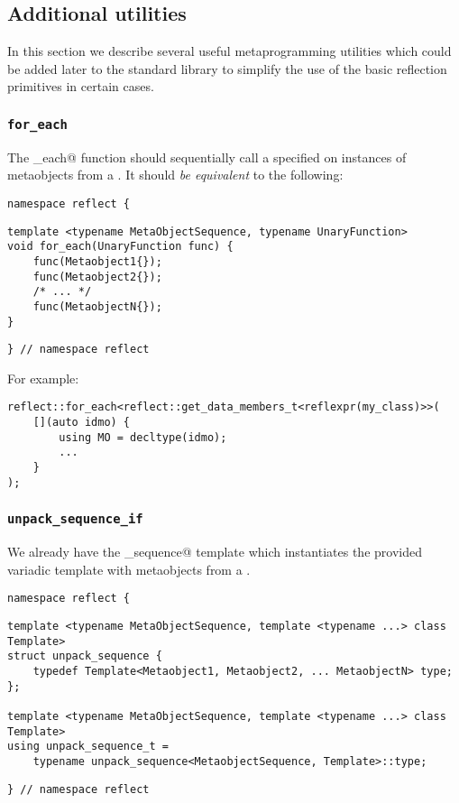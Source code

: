 \subsection{Additional utilities}
\label{fut-facade}

In this section we describe several useful metaprogramming utilities which
could be added later to the standard library to simplify the use of the basic
reflection primitives in certain cases.
 
\subsubsection{\texttt{for\_each}}
\label{fac-for-each}

The \verb@for_each@ function should sequentially call a specified
\verb@UnaryFunction@ on instances of metaobjects from
a . It should {\em be equivalent} to the following:

\begin{verbatim}
namespace reflect {
\end{verbatim}
\begin{verbatim}
template <typename MetaObjectSequence, typename UnaryFunction>
void for_each(UnaryFunction func) {
	func(Metaobject1{});
	func(Metaobject2{});
	/* ... */
	func(MetaobjectN{});
}
\end{verbatim}
\begin{verbatim}
} // namespace reflect
\end{verbatim}

For example:

\begin{verbatim}
reflect::for_each<reflect::get_data_members_t<reflexpr(my_class)>>(
	[](auto idmo) {
		using MO = decltype(idmo);
		...
	}
);
\end{verbatim}

\subsubsection{\texttt{unpack\_sequence\_if}}
\label{fac-unpack-sequence}

We already have the \verb@unpack_sequence@ template which instantiates
the provided variadic template with metaobjects from a .

\begin{verbatim}
namespace reflect {
\end{verbatim}
\begin{verbatim}
template <typename MetaObjectSequence, template <typename ...> class Template>
struct unpack_sequence {
	typedef Template<Metaobject1, Metaobject2, ... MetaobjectN> type;
};

template <typename MetaObjectSequence, template <typename ...> class Template>
using unpack_sequence_t =
	typename unpack_sequence<MetaobjectSequence, Template>::type;
\end{verbatim}
\begin{verbatim}
} // namespace reflect
\end{verbatim}

